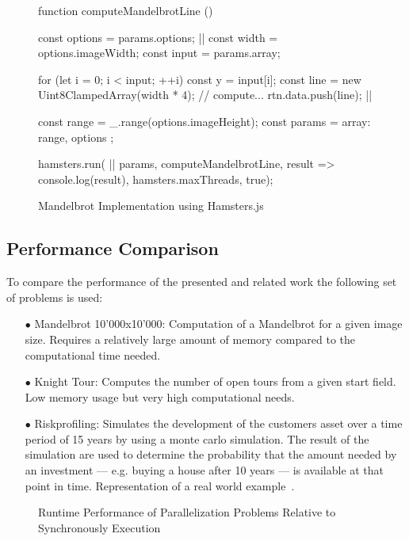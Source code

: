 \begin{figure}
\begin{javascriptcode}
function computeMandelbrotLine () {
	const options = params.options; |$\label{code:hamstersjs-params}$|
	const width = options.imageWidth;
	const input = params.array;

	for (let i = 0; i < input; ++i) {
		const y = input[i];
		const line = new Uint8ClampedArray(width * 4);
		// compute...
		rtn.data.push(line); |$\label{code:hamsterjs-result}$|
	}
}

const range = _.range(options.imageHeight);
const params = {
	array: range,
	options
};

hamsters.run( |$\label{code:hamsterjs-start}$|
	params,  
	computeMandelbrotLine, 
	result => console.log(result), 
	hamsters.maxThreads, 
	true);
\end{javascriptcode}
\caption{Mandelbrot Implementation using Hamsters.js}
\label{fig:mandelbrot-hamsterjs}
\end{figure}


\subsection{Performance Comparison}
To compare the performance of the presented and related work the following set of problems is used:

\begin{itemize}
	\item[$\bullet$] Mandelbrot 10'000x10'000: Computation of a Mandelbrot for a given image size. Requires a relatively large amount of memory compared to the computational time needed.
	\item[$\bullet$] Knight Tour: Computes the number of open tours from a given start field. Low memory usage but very high computational needs.
	\item[$\bullet$] Riskprofiling: Simulates the development of the customers asset over a time period of 15 years by using a monte carlo simulation. The result of the simulation are used to determine the probability that the amount needed by an investment --- e.g. buying a house after 10 years --- is available at that point in time. Representation of a real world example~\cite{Kwsoft2016}.
\end{itemize}

\begin{figure*}
		
	\caption{Runtime Performance of Parallelization Problems Relative to Synchronously Execution}
	\label{fig:runtime-performance}
\end{figure*}

